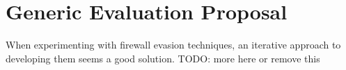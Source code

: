 \section{Generic Evaluation Proposal}
When experimenting with firewall evasion techniques, an iterative approach to developing them seems a good solution. 
{\color{red}TODO: more here or remove this}
